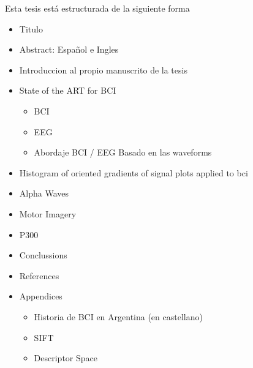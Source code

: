 \documentclass[11pt,twoside,openright]{moddalthesis}
\begin{document}
Esta tesis está estructurada de la siguiente forma

\begin{itemize}
\item Titulo
\item Abstract: Español e Ingles
\item Introduccion al propio manuscrito de la tesis
\item State of the ART for BCI
\begin{itemize}
\item BCI
\item EEG
\item Abordaje BCI / EEG Basado en las waveforms
\end{itemize}
\item Histogram of oriented gradients of signal plots applied to bci
\item Alpha Waves
\item Motor Imagery
\item P300
\item Conclussions
\item References
\item Appendices
\begin{itemize}
\item Historia de BCI en Argentina (en castellano)
\item SIFT
\item Descriptor Space
\end{itemize}
\end{itemize}











%

\appendix
\cleardoublepage







\linespread{1.44}



%  
\end{document}
